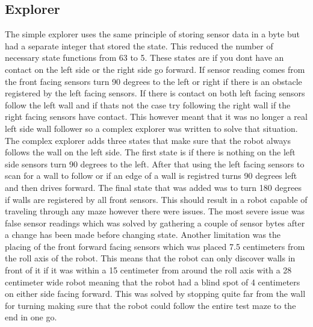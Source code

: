\documentclass[10pt,a4paper,twocolumn]{article}
\begin{document}
\subsection{Explorer}
The simple explorer uses the same principle of storing sensor data in a byte but
had a separate integer that stored the state. This reduced the  number of
necessary state functions from 63 to 5. These states are if you dont have an
contact on the left side or the right side go forward. If sensor reading comes
from the front facing sensors turn 90 degrees to the left or right if there is
an obstacle registered by the left facing sensors. If there is contact on both
left facing sensors follow the left wall and if thats not the case try following
the right wall if the right facing sensors have contact. This however meant that
it was no longer a real left side wall follower so a complex explorer was
written to solve that situation. The complex explorer adds three states that
make sure that the robot always follows the wall on the left side. The first
state is if there is nothing on the left side sensors turn 90 degrees to the
left. After that using the left facing sensors to scan for a wall to follow or
if an edge of a wall is registred turns 90 degrees left and then drives forward.
The final state that was added was to turn 180 degrees if walls are registered
by all front sensors. This should result in a robot capable of traveling through
any maze however there were issues. The most severe issue was false sensor
readings which was solved by gathering a couple of sensor bytes after a change
has been made before changing state. Another limitation was the placing of the
front forward facing sensors which was placed 7.5 centimeters from the roll axis
of the robot. This means that the robot can only discover walls in front of it
if it was within a 15 centimeter from around the roll axis with a 28 centimeter
wide robot meaning that the robot had a blind spot of 4 centimeters on either
side facing forward. This was solved by stopping quite far from the wall for
turning making sure that the robot could follow the entire test maze to the end
in one go.
\end{document}
